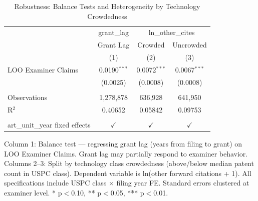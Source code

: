 
\begin{table}[htbp]
   \caption{\label{tab:robustness} Robustness: Balance Tests and Heterogeneity by Technology Crowdedness}
   \bigskip
   \centering
   \begin{tabular}{lccc}
      \toprule
       & grant\_lag & \multicolumn{2}{c}{ln\_other\_cites}\\
                                      & Grant Lag      & Crowded        & Uncrowded \\   
                                      & (1)            & (2)            & (3)\\  
      \midrule 
      LOO Examiner Claims             & 0.0190$^{***}$ & 0.0072$^{***}$ & 0.0067$^{***}$\\   
                                      & (0.0025)       & (0.0008)       & (0.0008)\\   
       \\
      Observations                    & 1,278,878      & 636,928        & 641,950\\  
      R$^2$                           & 0.40652        & 0.05842        & 0.09753\\  
       \\
      art\_unit\_year fixed effects   & $\checkmark$   & $\checkmark$   & $\checkmark$\\   
      \bottomrule
   \end{tabular}
   
   \par \raggedright 
   Column 1: Balance test — regressing grant lag (years from filing to grant) on LOO Examiner Claims. Grant lag may partially respond to examiner behavior. Columns 2--3: Split by technology class crowdedness (above/below median patent count in USPC class). Dependent variable is ln(other forward citations + 1). All specifications include USPC class $\times$ filing year FE. Standard errors clustered at examiner level. * p$<$0.10, ** p$<$0.05, *** p$<$0.01.
\end{table}


